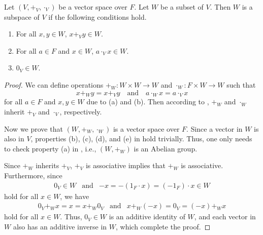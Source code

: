 \begin{theorem}\label{thm:subspace}
  Let $(V, +_V, \cdot_V)$ be a vector space over $F$.
  Let $W$ be a subset of $V$.
  Then $W$ is a subspace of $V$ if the following conditions hold.
  \begin{enumerate}
    \item For all $x, y \in W$, $x +_V y \in W$.
    \item For all $a \in F$ and $x \in W$, $a \cdot_V x \in W$.
    \item $0_V \in W$.
  \end{enumerate}
\end{theorem}
\begin{proof}
  We can define operations $+_W: W \times W \to W$
  and $\cdot_W: F \times W \to W$ such that
  \begin{equation*}
    x +_W y = x +_V y
      \quad \text{and}
      \quad a \cdot_W x = a \cdot_V x
  \end{equation*}
  for all $a \in F$ and $x, y \in W$ due to (a) and (b).
  Then according to , $+_W$ and $\cdot_W$ inherit
  $+_V$ and $\cdot_V$, respectively.

  Now we prove that $(W, +_W, \cdot_W)$ is a vector space over $F$.
  Since a vector in $W$ is also in $V$, properties (b), (c), (d), and (e)
  in  hold trivially.
  Thus, one only needs to check property (a) in ,
  i.e., $(W, +_W)$ is an Abelian group.

  Since $+_W$ inherits $+_V$, $+_V$ is associative implies that
  $+_W$ is associative.
  Furthermore, since
  \begin{equation*}
    \begin{array}{lll}
      0_V \in W
        & \text{and}
        & -x = -(1_F \cdot x) = (-1_F) \cdot x \in W
    \end{array}
  \end{equation*}
  hold for all $x \in W$, we have
  \begin{equation*}
    \begin{array}{lll}
      0_V +_W x = x = x +_W 0_V
        & \text{and}
        & x +_W (-x) = 0_V = (-x) +_W x
    \end{array}
  \end{equation*}
  hold for all $x \in W$.
  Thus, $0_V \in W$ is an additive identity of $W$, and each vector in $W$
  also has an additive inverse in $W$, which complete the proof.
\end{proof}

